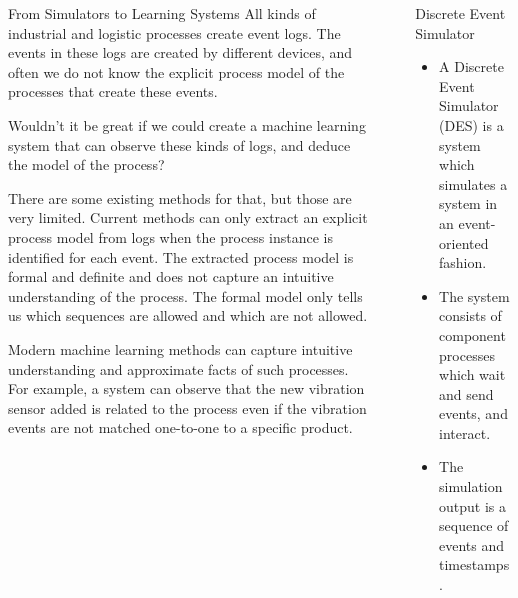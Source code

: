 \documentclass[final,xcolor={usenames,x11names}]{beamer}
\newlength{\sepwid}
\newlength{\onecolwid}
\begin{document}
\begin{frame}[t]
\begin{columns}[t]
\begin{column}{\onecolwid}
\vspace{10cm}

\begin{block}{From Simulators to Learning Systems}
All kinds of industrial and logistic processes create event logs. The events in these logs are created by different devices, and often we do not know
the explicit process model of the processes that create these events.

Wouldn't it be great if we could create a machine learning system that can observe these kinds of logs, and deduce the model of the process?

There are some existing methods for that, but those are very limited. Current methods can only extract an explicit process model
from logs when the process instance is identified for each event. The extracted process model is formal and definite and does not capture
an intuitive understanding of the process. The formal model only tells us which sequences are allowed and which are not allowed.

Modern machine learning methods can capture intuitive understanding and approximate facts of such processes. For example, a system can observe that the new vibration sensor added is related to the process
even if the vibration events are not matched one-to-one to a specific product.
\end{block}

\end{column}
\begin{column}{\sepwid}\end{column} %

\begin{column}{\onecolwid}

\begin{alertblock}{Discrete Event Simulator}

\begin{itemize}
 \item A Discrete Event Simulator (DES) is a system which simulates a system in an event-oriented fashion.
 \item The system consists of component processes which wait and send events, and interact.
 \item The simulation output is a sequence of events and timestamps.
\end{itemize}


\end{alertblock}

\vspace{3cm}


\end{column}
\end{columns}
\end{frame}
\end{document}
